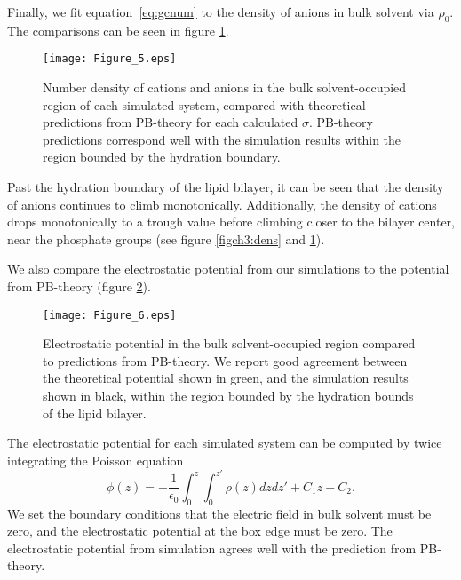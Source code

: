 Finally, we fit equation~\ref{eq:gcnum} to the density of anions in 
bulk solvent via $\rho_0$. The comparisons
can be seen in figure \ref{figch3:catgcdens}.
\begin{figure}[h!tb]
    \caption[Number densities of cations and anions]{Number density of cations and anions in the bulk solvent-occupied region of each
    simulated system, compared with theoretical predictions from PB-theory for each calculated $\sigma$. PB-theory predictions
    correspond well with the simulation results within the region bounded by the hydration boundary.}
    \label{figch3:catgcdens}
    \texttt{[image: Figure\_5.eps]}
\end{figure}
Past the hydration boundary of the lipid bilayer, it can be seen that the density of anions continues 
to climb monotonically. Additionally, the density of cations 
drops monotonically to a trough value before climbing closer to the bilayer center, near the phosphate groups 
(see figure \ref{figch3:dens} and \ref{figch3:catgcdens}). 


We also compare {the} 
electrostatic potential from our simulations 
to the potential from PB-theory 
(figure \ref{figch3:potgc}). 
\begin{figure}[h!tb]
    \caption[Electrostatic potential]{Electrostatic potential in the bulk solvent-occupied region compared to predictions from PB-theory. We report good
    agreement between the theoretical potential shown in green, and the simulation results shown in black, within the region bounded by the hydration
    bounds of the lipid bilayer.}
    \label{figch3:potgc}
    \texttt{[image: Figure\_6.eps]}
\end{figure}
The electrostatic potential for each simulated system can be computed 
by twice integrating the Poisson equation 
\begin{equation}
    \phi(z)=-\frac{1}{\epsilon_0}\int_{0}^{z}\int_{0}^{z'}\rho(z) dz dz' + C_1z + C_2\text{.}
    \label{eq:poissonint}
\end{equation}
We set the boundary conditions that
the electric field in bulk solvent must be zero, and the electrostatic potential at the box edge must be zero.
The electrostatic potential from simulation agrees well with the prediction from PB-theory.


